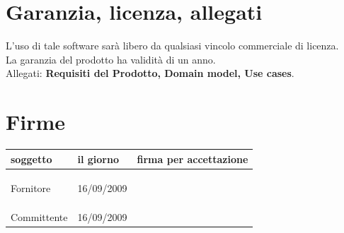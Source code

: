 \documentclass[a4paper, 12pt]{report}
\begin{document}
\section*{Garanzia, licenza, allegati}
L'uso di tale software sarà libero da qualsiasi vincolo commerciale di licenza.
\\
La garanzia del prodotto ha validit\`a di un anno.
\\
Allegati: \textbf{Requisiti del Prodotto, Domain model, Use cases}.

\newpage

\section*{Firme}
\begin{table}[h!]
  \begin{center}
    \begin{tabular}{ l  l | p{60mm} }
    \textbf{soggetto} & \textbf{il giorno} & \textbf{firma per accettazione} \\
	\hline    
	\\\\\\
	Fornitore & 16/09/2009 &  \\
	\hline\\\\\\
	Committente & 16/09/2009 &  \\
    \hline
    \end{tabular}
  \end{center}
\end{table}
\newpage
\end{document}
